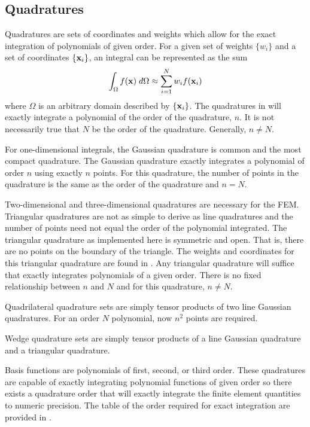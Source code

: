   \subsection{Quadratures}
    \label{sec:quadratures}
    Quadratures are sets of coordinates and weights which allow for the exact 
    integration of polynomials of given order. For a given set of weights 
    $\{w_i\}$ and a set of coordinates $\{\mathbf{x}_i\}$, an integral can be 
    represented as the sum
    \begin{equation}
      \label{eq:quadrature}
      \int_{\Omega} f(\mathbf{x}) \;d\Omega \approx \sum_{i=1}^{N} w_i f(\mathbf{x}_i)
    \end{equation}
    where $\Omega$ is an arbitrary domain described by $\{\mathbf{x}_i\}$. The 
    quadratures in  will exactly integrate a polynomial of
    the order of the quadrature, $n$. It is not necessarily true that $N$ be the 
    order of the quadrature. Generally, $n \ne N$.
    
    For one-dimensional integrals, the Gaussian quadrature is common and the 
    most compact quadrature. The Gaussian quadrature exactly integrates a 
    polynomial of order $n$ using exactly $n$ points. For this quadrature, the
    number of points in the quadrature is the same as the order of the
    quadrature and $n=N$.
    
    Two-dimensional and three-dimensional quadratures are necessary for the 
    FEM. Triangular quadratures are not as simple to derive
    as line quadratures and the number of points need not equal the order of the
    polynomial integrated. The triangular quadrature as implemented here is 
    symmetric and open. That is, there are no points on the boundary of the 
    triangle. The weights and coordinates for this triangular quadrature are 
    found in \cite{triangleQuadrature}. Any triangular quadrature will suffice
    that exactly integrates polynomials of a given order. There is no fixed
    relationship between $n$ and $N$ and for this quadrature, $n \ne N$.
    
    Quadrilateral quadrature sets are simply tensor products of two line 
    Gaussian quadratures. For an order $N$ polynomial, now $n^2$ points are 
    required. 
    
    Wedge quadrature sets are simply tensor products of a line Gaussian 
    quadrature and a triangular quadrature. 
    
    Basis functions are polynomials of first, second, or third order. These 
    quadratures are capable of exactly integrating polynomial functions of given
    order so there exists a quadrature order that will exactly integrate the 
    finite element quantities to numeric precision. The table of the order
    required for exact integration are provided in .

